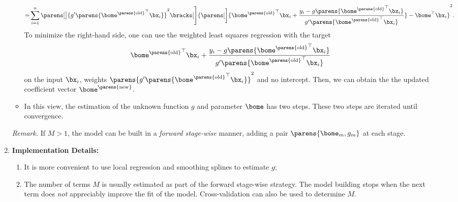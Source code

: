 \documentclass[12pt]{article}
\begin{document}
\begin{enumerate}[label=\textbf{\arabic*.}]
\begin{itemize}
\begin{align*}
			= & \sum_{i=1}^n \parens[\big]{g' \parens{ {\bome^{\parens{\text{old}}}}^\top \bx_i}}^2 \bracks[\Bigg]{\parens[\bigg]{ {\bome^{\parens{\text{old}}}}^\top \bx_i +  \frac{y_i - g \parens{ {\bome^{\parens{\text{old}}}}^\top \bx_i} }{g' \parens{ {\bome^{\parens{\text{old}}}}^\top \bx_i}}} - \bome^\top \bx_i}^2. 
		\end{align*}
		To minimize the right-hand side, one can use the weighted least squares regression with the target 
		\begin{align*}
			{\bome^{\parens{\text{old}}}}^\top \bx_i +  \frac{y_i - g \parens{ {\bome^{\parens{\text{old}}}}^\top \bx_i} }{g' \parens{ {\bome^{\parens{\text{old}}}}^\top \bx_i}}
		\end{align*}
		on the input $\bx_i$, weights $\parens{g' \parens{ {\bome^{\parens{\text{old}}}}^\top \bx_i}}^2$ and no intercept. Then, we can obtain the the updated coefficient vector $\bome^{\parens{\text{new}}}$. 
		
		\item In this view, the estimation of the unknown function $g$ and parameter $\bome$ has two steps. These two steps are iterated until convergence.  

	\end{itemize}
	
	\textit{Remark.} If $M > 1$, the model can be built in a \textit{forward stage-wise} manner, adding a pair $\parens{\bome_m, g_m}$ at each stage. 
	
	\item \textbf{Implementation Details:}
	\begin{enumerate}
		\item It is more convenient to use local regression and smoothing splines to estimate $g$; 
		\item The number of terms $M$ is usually estimated as part of the forward stage-wise strategy. The model building stops when the next term does \emph{not} appreciably improve the fit of the model. Cross-validation can also be used to determine $M$. 
	\end{enumerate}

\end{enumerate}


\printbibliography
\end{document}
